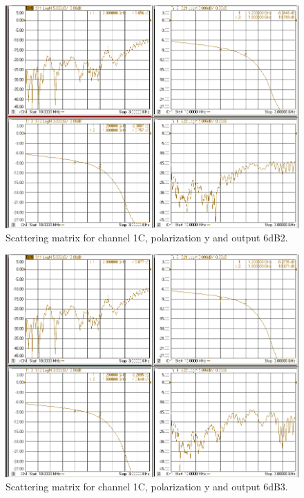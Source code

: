 \documentclass[12pt,a4paper,oneside]{article}
\begin{document}
\begin{figure}[H]
\centering
\includegraphics[width=0.9\linewidth]{VNA_results/1Cy_6dB2.png}
\caption{Scattering matrix for channel 1C, polarization y and output 6dB2.}
\label{fig:1Cy_6dB2}
\end{figure}


\begin{figure}[H]
\centering
\includegraphics[width=0.9\linewidth]{VNA_results/1Cy_6dB3.png}
\caption{Scattering matrix for channel 1C, polarization y and output 6dB3.}
\label{fig:1Cy_6dB3}
\end{figure}
\end{document}
